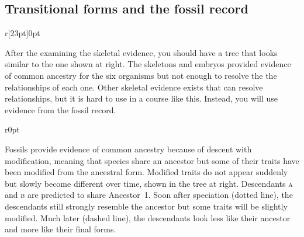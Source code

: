 \documentclass[12pt, hidelinks]{exam}
\newlength{\tempintextsep}
\begin{document}
\subsection*{Transitional forms and the fossil record}%


\setlength{\intextsep}{0pt}

\begin{wrapfigure}[10]{r}[23pt]{0pt}
\end{wrapfigure} After the examining the skeletal evidence, you should have a 
tree that looks similar to the one shown at right. The skeletons and embryos
provided evidence of common ancestry for the six organisms but not enough to resolve 
the the relationships of each one. Other skeletal evidence exists
that can resolve relationships, but it is hard to use in a course like this.
 Instead, you will use evidence from the fossil record. %


\setlength{\intextsep}{\tempintextsep}

\begin{wrapfigure}[13]{r}{0pt}
\end{wrapfigure}Fossils provide evidence of common ancestry because of descent with modification, meaning that species share an ancestor but some of their traits have been modified from the ancestral form. Modified traits do not appear suddenly but slowly become different over time, shown in the tree at right. Descendants \textsc{a} and \textsc{b} are predicted to share Ancestor~1. Soon after speciation (dotted line), the descendants still strongly resemble the ancestor but some traits will be slightly modified. Much later (dashed line), the descendants look less like their ancestor and more like their final forms. 
\end{document}

